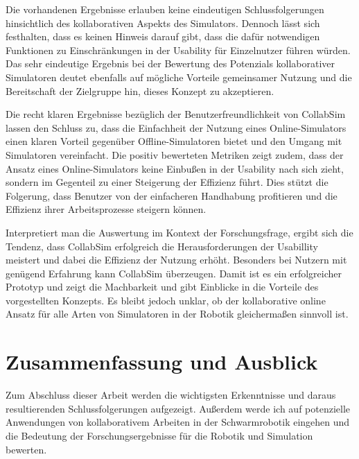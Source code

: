 \documentclass[german,version-2020-11]{uzl-thesis}
\begin{document}
  

 
  Die vorhandenen Ergebnisse erlauben keine eindeutigen Schlussfolgerungen hinsichtlich des kollaborativen Aspekts des Simulators. 
  Dennoch lässt sich festhalten, dass es keinen Hinweis darauf gibt, dass die dafür notwendigen Funktionen zu Einschränkungen in der Usability für Einzelnutzer führen würden. 
  Das sehr eindeutige Ergebnis bei der Bewertung des Potenzials kollaborativer Simulatoren deutet ebenfalls auf mögliche Vorteile gemeinsamer Nutzung und die Bereitschaft der Zielgruppe hin, dieses Konzept zu akzeptieren.

  Die recht klaren Ergebnisse bezüglich der Benutzerfreundlichkeit von CollabSim lassen den Schluss zu, dass die Einfachheit der Nutzung eines Online-Simulators einen klaren 
  Vorteil gegenüber Offline-Simulatoren bietet und den Umgang mit Simulatoren vereinfacht. 
  Die positiv bewerteten Metriken zeigt zudem, dass der Ansatz eines Online-Simulators keine Einbußen in der Usability nach sich zieht, sondern im Gegenteil zu einer Steigerung der Effizienz führt. 
  Dies stützt die Folgerung, dass Benutzer von der einfacheren Handhabung profitieren und die Effizienz ihrer Arbeitsprozesse steigern können.

  Interpretiert man die Auswertung im Kontext der Forschungsfrage, ergibt sich die Tendenz, dass CollabSim erfolgreich die Herausforderungen der Usabillity meistert und dabei die Effizienz der Nutzung erhöht.
  Besonders bei Nutzern mit genügend Erfahrung kann CollabSim überzeugen. 
  Damit ist es ein erfolgreicher Prototyp und zeigt die Machbarkeit und gibt Einblicke in die Vorteile des vorgestellten Konzepts.
  Es bleibt jedoch unklar, ob der kollaborative online Ansatz für alle Arten von Simulatoren in der Robotik gleichermaßen sinnvoll ist.




      

\chapter{Zusammenfassung und Ausblick}
\label{chapter-con}

Zum Abschluss dieser Arbeit werden die wichtigsten Erkenntnisse und daraus resultierenden Schlussfolgerungen aufgezeigt. 
Außerdem werde ich auf potenzielle Anwendungen von kollaborativem Arbeiten in der Schwarmrobotik eingehen und 
die Bedeutung der Forschungsergebnisse für die Robotik und Simulation bewerten.
\end{document}
